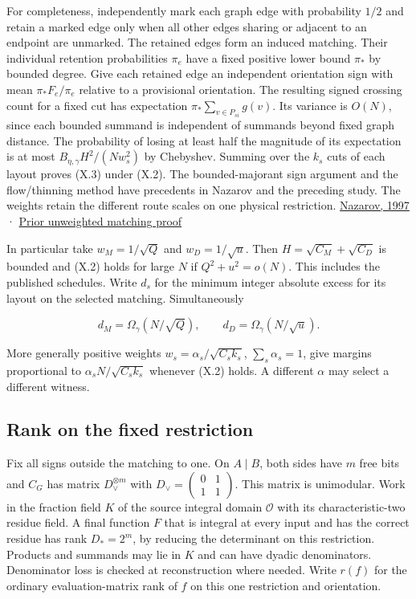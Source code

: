 \documentclass[
  11pt,
]{article}
\begin{document}
For completeness, independently mark each graph edge with probability
\(1/2\) and retain a marked edge only when all other edges sharing or
adjacent to an endpoint are unmarked. The retained edges form an induced
matching. Their individual retention probabilities \(\pi_e\) have a
fixed positive lower bound \(\pi_*\) by bounded degree. Give each
retained edge an independent orientation sign with mean
\(\pi_*F_e/\pi_e\) relative to a provisional orientation. The resulting
signed crossing count for a fixed cut has expectation
\(\pi_*\sum_{v\in P_{si}}g(v)\). Its variance is \(O(N)\), since each
bounded summand is independent of summands beyond fixed graph distance.
The probability of losing at least half the magnitude of its expectation
is at most \(B_{\eta,\gamma}H^2/(Nw_s^2)\) by Chebyshev. Summing over
the \(k_s\) cuts of each layout proves (X.3) under (X.2). The
bounded-majorant sign argument and the flow/thinning method have
precedents in Nazarov and the preceding study. The weights retain the
different route scales on one physical restriction.
\href{https://www.mathnet.ru/eng/aa774}{Nazarov, 1997} ·
\href{https://github.com/dch-and-Elara/some-research-inspired-by-openais-eth-preprint/tree/main/root-separation}{Prior unweighted
matching proof}

In particular take \(w_M=1/\sqrt Q\) and \(w_D=1/\sqrt u\). Then
\(H=\sqrt{C_M}+\sqrt{C_D}\) is bounded and (X.2) holds for large \(N\)
if \(Q^2+u^2=o(N)\). This includes the published schedules. Write
\(d_s\) for the minimum integer absolute excess for its layout on the
selected matching. Simultaneously

\[
 d_M=\Omega_\gamma(N/\sqrt Q),\qquad d_D=\Omega_\gamma(N/\sqrt u).
 \tag{X.5}
\]

More generally positive weights \(w_s=\alpha_s/\sqrt{C_s k_s}\),
\(\sum_s\alpha_s=1\), give margins proportional to
\(\alpha_sN/\sqrt{C_s k_s}\) whenever (X.2) holds. A different
\(\alpha\) may select a different witness.

\subsection{Rank on the fixed
restriction}\label{rank-on-the-fixed-restriction}

Fix all signs outside the matching to one. On \(A\mid B\), both sides
have \(m\) free bits and \(C_G\) has matrix \(D_\lor^{\otimes m}\) with
\(D_\lor=\left(\begin{smallmatrix}0&1\\1&1\end{smallmatrix}\right)\).
This matrix is unimodular. Work in the fraction field \(K\) of the
source integral domain \(\mathcal O\) with its characteristic-two
residue field. A final function \(F\) that is integral at every input
and has the correct residue has rank \(D_*=2^m\), by reducing the
determinant on this restriction. Products and summands may lie in \(K\)
and can have dyadic denominators. Denominator loss is checked at
reconstruction where needed. Write \(r(f)\) for the ordinary
evaluation-matrix rank of \(f\) on this one restriction and orientation.
\end{document}
